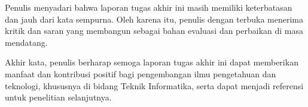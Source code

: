 \begin{justifying}
	Penulis menyadari bahwa laporan tugas akhir ini masih memiliki keterbatasan dan jauh dari kata sempurna. Oleh karena itu, penulis dengan terbuka menerima kritik dan saran yang membangun sebagai bahan evaluasi dan perbaikan di masa mendatang. \par

	Akhir kata, penulis berharap semoga laporan tugas akhir ini dapat memberikan manfaat dan kontribusi positif bagi pengembangan ilmu pengetahuan dan teknologi, khususnya di bidang Teknik Informatika, serta dapat menjadi referensi untuk penelitian selanjutnya.
	
\end{justifying}
\clearpage
